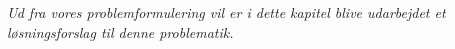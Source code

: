 \textit{Ud fra vores problemformulering vil er i dette kapitel blive udarbejdet et løsningsforslag til denne problematik. \wip{}}